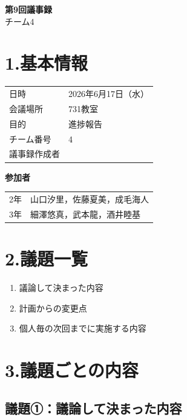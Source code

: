 \documentclass[a4paper,12pt]{ltjsarticle}
\begin{document}
\begin{center}
  {\Large \textbf{第9回議事録}}\\[8pt]
  {\large チーム4}
\end{center}

\vspace{4mm}

\section*{1.基本情報}
\begin{tabular}{ll}
  \toprule
  日時     & 2026年6月17日（水） \\
  会議場所 & 731教室 \\
  目的     & 進捗報告 \\
  チーム番号 & 4 \\
  議事録作成者 &  \\
  \bottomrule
\end{tabular}

\vspace{4mm}
\noindent\textbf{参加者}

\begin{tabular}{ll}
  2年 & 山口汐里，佐藤夏美，成毛海人 \\
  3年 & 細澤悠真，武本龍，酒井睦基 \\
\end{tabular}

\section*{2.議題一覧}
\begin{enumerate}[label=議題\arabic*：]
  \item 議論して決まった内容
  \item 計画からの変更点
  \item 個人毎の次回までに実施する内容
\end{enumerate}

\section*{3.議題ごとの内容}

\subsection*{議題①：議論して決まった内容}
\end{document}

